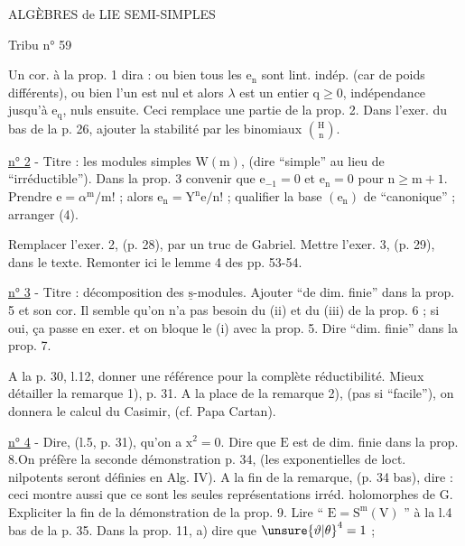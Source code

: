 ALGÈBRES de LIE SEMI-SIMPLES 

Tribu n° 59

Un cor. à la prop. 1 dira : ou bien tous les $\mathrm{e}_{\mathrm n}$ sont lint. indép. (car de poids différents), ou bien l'un est nul et alors $\lambda$ est un entier $\mathrm{q}\geqslant 0$, indépendance jusqu'à $\mathrm{e}_{\mathrm q}$, nuls ensuite. Ceci remplace une partie de la prop. 2. Dans l'exer. du bas de la p. 26, ajouter la stabilité par les binomiaux $\binom{\mathrm{H}}{\mathrm{n}}$.

\uline{n° 2} - Titre : les modules simples $\mathrm{W}(\mathrm{m})$, (dire ``simple'' au lieu de ``irréductible''). Dans la prop. 3 convenir que $\mathrm{e}_{-1}=0$ et $\mathrm{e}_{\mathrm n}=0$ pour $\mathrm{n}\geqslant\mathrm{m}+1$. Prendre $\mathrm{e}=\alpha^{\mathrm m}/\mathrm{m}!$ ; alors $\mathrm{e}_{\mathrm n}=\mathrm{Y}^{\mathrm n}\mathrm{e}/\mathrm{n}!$ ; qualifier la base $(\mathrm{e}_{\mathrm n})$ de ``canonique'' ; arranger (4).

Remplacer l'exer. 2, (p. 28), par un truc de Gabriel. Mettre l'exer. 3, (p. 29), dans le texte. Remonter ici le lemme 4 des pp. 53-54.

\uline{n° 3} - Titre : décomposition des $\underline{\mathrm{s}}$-modules. Ajouter ``de dim. finie'' dans la prop. 5 et son cor. Il semble qu'on n'a pas besoin du (ii) et du (iii) de la prop. 6 ; si oui, ça passe en exer. et on bloque le (i) avec la prop. 5. Dire ``dim. finie'' dans la prop. 7.

A la p. 30, l.12, donner une référence pour la complète réductibilité. Mieux détailler la remarque 1), p. 31. A la place de la remarque 2), (pas si ``facile''), on donnera le calcul du Casimir, (cf. Papa Cartan).

\uline{n° 4} - Dire, (l.5, p. 31), qu'on a $\mathrm{x}^2=0$. Dire que $\mathrm{E}$ est de dim. finie dans la prop. 8.On préfère la seconde démonstration p. 34, (les exponentielles de loct. nilpotents seront définies en Alg. IV). A la fin de la remarque, (p. 34 bas), dire : ceci montre aussi que ce sont les seules représentations irréd. holomorphes de $\mathrm{G}$. Expliciter la fin de la démonstration de la prop. 9. Lire `` $\mathrm{E}=\mathrm{S}^{\mathrm m}(\mathrm{V})$ '' à la l.4 bas de la p. 35. Dans la prop. 11, a) dire que $\unsure{\vartheta|\theta}^4=1$ ;

